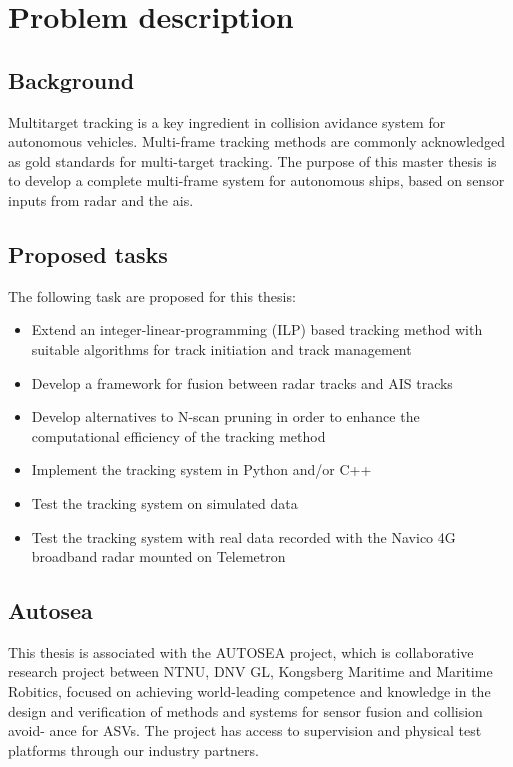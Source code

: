 
\section*{Problem description}

\subsection*{Background}\label{sub:background}
Multitarget tracking is a key ingredient in collision avidance system for autonomous vehicles. Multi-frame tracking methods are commonly acknowledged as gold standards for multi-target tracking. The purpose of this master thesis is to develop a complete multi-frame system for autonomous ships, based on sensor inputs from radar and the \gls{ais}.

\subsection*{Proposed tasks}\label{sub:proposed_tasks}
The following task are proposed for this thesis:
\begin{itemize}
	\item{Extend an integer-linear-programming (ILP) based tracking method with suitable algorithms for track initiation and track management}
	\item{Develop a framework for fusion between radar tracks and AIS tracks}
	\item{Develop alternatives to N-scan pruning in order to enhance the computational efficiency of the tracking method}
	\item{Implement the tracking system in Python and/or C++}
	\item{Test the tracking system on simulated data}
	\item{Test the tracking system with real data recorded with the Navico 4G broadband radar mounted on Telemetron}
\end{itemize}

\subsection*{Autosea}\label{sub:autosea}
This thesis is associated with the AUTOSEA project, which is collaborative research project between NTNU, DNV GL, Kongsberg Maritime and Maritime Robitics, focused on achieving world-leading competence and knowledge in the design and verification of methods and systems for sensor fusion and collision avoid- ance for ASVs. The project has access to supervision and physical test platforms through our industry partners.